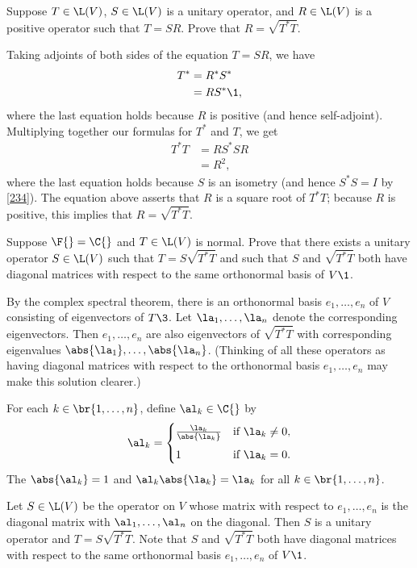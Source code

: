 \exercise
Suppose $T \in \L(V)$, $S \in \L(V)$ is a unitary operator,
and $R \in \L(V)$ is a  positive operator such that $T = SR$.  Prove that
$R = \sqrt{T^* T}$.

\begin{Solution}
Taking adjoints of both sides of the equation $T = SR$, we have
\begin{align*}
T^* &= R^* S^* \\
&= RS^*\1,
\end{align*}
where the last equation holds because $R$ is positive (and hence self-adjoint).
Multiplying together our formulas for $T^*$ and $T$, we get
\begin{align*}
T^* T &= RS^* S R \\
& = R^2,
\end{align*}
where the last equation holds because $S$ is an isometry (and hence $S^* S = I$
by \ref{234}).  The equation above asserts that $R$ is a square root of $T^*T$;
because $R$ is positive, this implies that $R = \sqrt{T^*T}$.
\end{Solution}

\exercise
Suppose $\F{} = \C{}$ and $T \in \L(V)$ is normal. Prove that there exists a unitary operator $S \in \L(V)$ such that $T = S \sqrt{T^*T}$ and such that $S$ and $\sqrt{T^*T}$ both have diagonal matrices with respect to the same orthonormal basis of $V\1$. \label{8PolarNor}

\begin{Solution}
By the complex spectral theorem, there is an orthonormal basis $e_1, \ldots, e_n$ of $V$ consisting of eigenvectors of $T\3$. Let
$\la_1, \ldots, \la_n$ denote the corresponding eigenvectors. Then $e_1, \ldots, e_n$ are also eigenvectors of $\sqrt{T^* T}$ with corresponding eigenvalues $\abs{\la_1}, \ldots, \abs{\la_n}$. (Thinking of all these operators as having diagonal matrices with respect to the orthonormal basis $e_1, \ldots, e_n$ may make this solution clearer.)

For each $k \in \br{1, \ldots, n}$, define $\al_k \in \C{}$ by
\[
\al_k = \begin{cases}
\frac{ \la_k }{ \abs{\la_k} } & \text{if } \la_k \ne 0, \\[6bp]
1 & \text{if } \la_k = 0.
\end{cases}
\]
The $\abs{\al_k} = 1$ and $\al_k \abs{\la_k} = \la_k$ for all $k \in \br{1, \ldots, n}$.

Let $S \in \L(V)$ be the operator on $V$ whose matrix with respect to $e_1, \ldots, e_n$ is the diagonal matrix with
$\al_1, \ldots, \al_n$ on the diagonal. Then $S$ is a unitary operator and $T = S \sqrt{T^*T}$. Note that $S$ and $\sqrt{T^*T}$ both have diagonal matrices with respect to the same orthonormal basis $e_1, \ldots, e_n$ of $V\1$.
\end{Solution}

